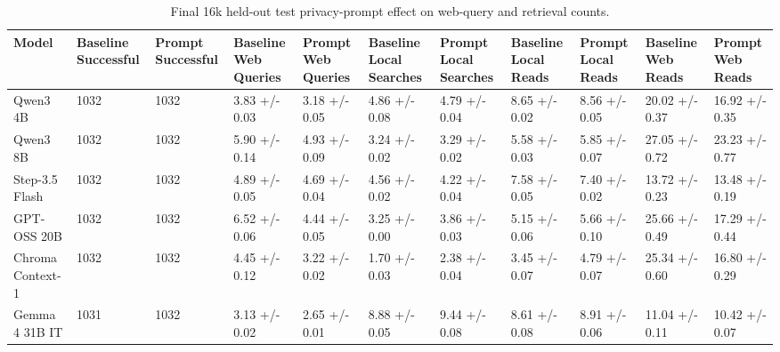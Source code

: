 \begin{table}[t]
\small
\centering
\begin{tabular}{lllllllllll}
\toprule
\textbf{Model} & \textbf{Baseline Successful} & \textbf{Prompt Successful} & \textbf{Baseline Web Queries} & \textbf{Prompt Web Queries} & \textbf{Baseline Local Searches} & \textbf{Prompt Local Searches} & \textbf{Baseline Local Reads} & \textbf{Prompt Local Reads} & \textbf{Baseline Web Reads} & \textbf{Prompt Web Reads} \\
\midrule
Qwen3 4B & 1032 & 1032 & 3.83 +/- 0.03 & 3.18 +/- 0.05 & 4.86 +/- 0.08 & 4.79 +/- 0.04 & 8.65 +/- 0.02 & 8.56 +/- 0.05 & 20.02 +/- 0.37 & 16.92 +/- 0.35 \\
Qwen3 8B & 1032 & 1032 & 5.90 +/- 0.14 & 4.93 +/- 0.09 & 3.24 +/- 0.02 & 3.29 +/- 0.02 & 5.58 +/- 0.03 & 5.85 +/- 0.07 & 27.05 +/- 0.72 & 23.23 +/- 0.77 \\
Step-3.5 Flash & 1032 & 1032 & 4.89 +/- 0.05 & 4.69 +/- 0.04 & 4.56 +/- 0.02 & 4.22 +/- 0.04 & 7.58 +/- 0.05 & 7.40 +/- 0.02 & 13.72 +/- 0.23 & 13.48 +/- 0.19 \\
GPT-OSS 20B & 1032 & 1032 & 6.52 +/- 0.06 & 4.44 +/- 0.05 & 3.25 +/- 0.00 & 3.86 +/- 0.03 & 5.15 +/- 0.06 & 5.66 +/- 0.10 & 25.66 +/- 0.49 & 17.29 +/- 0.44 \\
Chroma Context-1 & 1032 & 1032 & 4.45 +/- 0.12 & 3.22 +/- 0.02 & 1.70 +/- 0.03 & 2.38 +/- 0.04 & 3.45 +/- 0.07 & 4.79 +/- 0.07 & 25.34 +/- 0.60 & 16.80 +/- 0.29 \\
Gemma 4 31B IT & 1031 & 1032 & 3.13 +/- 0.02 & 2.65 +/- 0.01 & 8.88 +/- 0.05 & 9.44 +/- 0.08 & 8.61 +/- 0.08 & 8.91 +/- 0.06 & 11.04 +/- 0.11 & 10.42 +/- 0.07 \\
\bottomrule
\end{tabular}
\caption{Final 16k held-out test privacy-prompt effect on web-query and retrieval counts.}
\label{tab:privacy_prompt_query_behavior}
\end{table}
